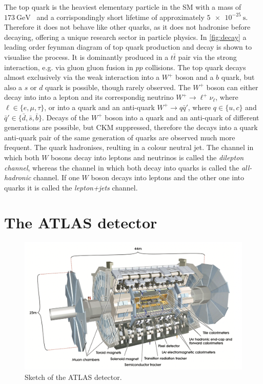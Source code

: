 The top quark is the heaviest elementary particle in the SM with a mass of $\SI{173}{\giga\eV}$~\cite{pdg} and a corrispondingly short lifetime of approximately $\SI{5e-25}{\s}$. Therefore it does not behave like other quarks, as it does not hadronise before decaying, offering a unique research sector in particle physics.
In \autoref{fig:decay} a leading order feynman diagram of top quark production and decay is shown to visualise the process.
It is dominantly produced in a $t\bar{t}$ pair via the strong interaction, e.g. via gluon gluon fusion in $pp$ collisions. The top quark decays almost exclusively via the weak interaction into a $W^+$ boson and a $b$ quark, but also a $s$ or $d$ quark is possible, though rarely observed.
The $W^+$ boson can either decay into into a lepton and its correspondig neutrino $W^+ \to \ell^+ \nu_\ell$, where $\ell \in \{e, \mu, \tau\}$, or into a quark and an anti-quark $W^+ \to q\bar{q}\prime$, where $q \in \{u, c\}$ and $\bar{q}\prime \in \{\bar{d}, \bar{s}, \bar{b}\}$.
Decays of the $W^+$ boson into a quark and an anti-quark of different generations are possible, but CKM suppressed, therefore the decays into a quark anti-quark pair of the same generation of quarks are observed much more frequent.
The quark hadronises, reulting in a colour neutral jet. The channel in which both $W$ bosons decay into leptons and neutrinos is called the \textit{dilepton channel}, whereas the channel in which both decay into quarks is called the \textit{all-hadronic} channel. If one $W$ boson decays into leptons and the other one into quarks it is called the \textit{lepton+jets} channel.

\section{The ATLAS detector}

\begin{figure}[tb]
  \centering
  \includegraphics[width=.8\textwidth]{graphics/detector.png}
  \caption{Sketch of the ATLAS detector. \cite{ATLAS}}
  \label{fig:detector}
\end{figure}


